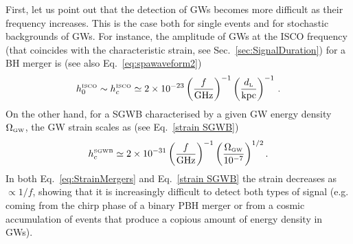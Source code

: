 \documentclass[11pt,a4paper]{article}
\begin{document}
First, let us point out that
the detection of GWs becomes more difficult as their frequency increases. This is the case both for single events and for stochastic backgrounds of GWs. For instance, the amplitude of GWs at the ISCO frequency (that coincides with the characteristic strain, see Sec.~\ref{sec:SignalDuration}) for a BH merger is (see also Eq.~\eqref{eq:spawaveform2})
\begin{equation}
\label{eq:StrainMergers}
h_0^{\text{\tiny ISCO}} \sim h_c^{\text{\tiny ISCO}} \simeq 
2
 \times 10^{-23} \left(\frac{f}{{\rm GHz}}\right)^{-1} \left(\frac{d_\text{\tiny L}}{{\rm kpc}}\right)^{-1} \,.
\end{equation}
On the other hand, for a SGWB characterised by a given GW energy density $\Omega_\text{\tiny GW}$, the GW strain scales as (see Eq.~\eqref{strain SGWB})
\begin{equation}\label{strain SGWB rep}
h_c^{\text{\tiny SGWB}} \simeq 2 \times 10^{-31} \left ( \frac{f}{{\rm GHz}} \right)^{-1} \left ( \frac{\Omega_\text{\tiny GW} }{10^{-7}} \right)^{1/2} .
\end{equation}
In both Eq.~\eqref{eq:StrainMergers} and Eq.~\eqref{strain SGWB} the strain decreases as $\propto 1/f$, showing that it is increasingly difficult to detect both types of signal (e.g. coming from the chirp phase of a binary PBH merger or from a cosmic accumulation of events that produce a copious amount of energy density in GWs).
\end{document}
